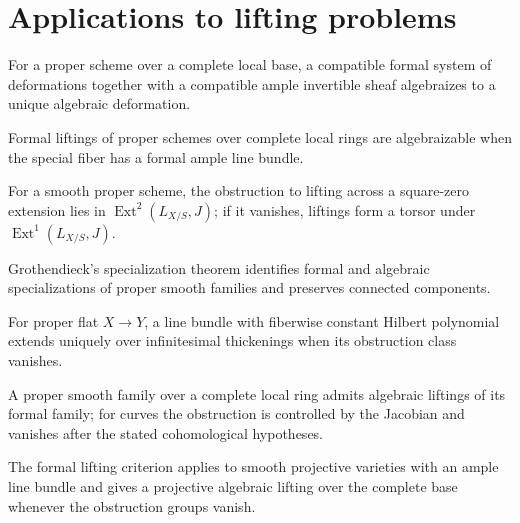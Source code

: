 \section{Applications to lifting problems}
\begin{theorem}\label{fga-thm-8-5-3}
For a proper scheme over a complete local base, a compatible formal system of
deformations together with a compatible ample invertible sheaf algebraizes to a
unique algebraic deformation.
\end{theorem}
\begin{corollary}\label{fga-cor-8-5-5}
Formal liftings of proper schemes over complete local rings are algebraizable
when the special fiber has a formal ample line bundle.
\end{corollary}
\begin{theorem}\label{fga-thm-8-5-12}
For a smooth proper scheme, the obstruction to lifting across a square-zero
extension lies in $\operatorname{Ext}^2(L_{X/S},J)$; if it vanishes, liftings
form a torsor under $\operatorname{Ext}^1(L_{X/S},J)$.
\end{theorem}
\begin{theorem}\label{fga-thm-8-5-15}
Grothendieck's specialization theorem identifies formal and algebraic
specializations of proper smooth families and preserves connected components.
\end{theorem}
\begin{proposition}\label{fga-prop-8-5-16}
For proper flat $X\to Y$, a line bundle with fiberwise constant Hilbert
polynomial extends uniquely over infinitesimal thickenings when its obstruction
class vanishes.
\end{proposition}
\begin{theorem}\label{fga-thm-8-5-19}
A proper smooth family over a complete local ring admits algebraic liftings of
its formal family; for curves the obstruction is controlled by the Jacobian and
vanishes after the stated cohomological hypotheses.
\end{theorem}
\begin{theorem}\label{fga-thm-8-5-20}
The formal lifting criterion applies to smooth projective varieties with an
ample line bundle and gives a projective algebraic lifting over the complete
base whenever the obstruction groups vanish.
\end{theorem}
